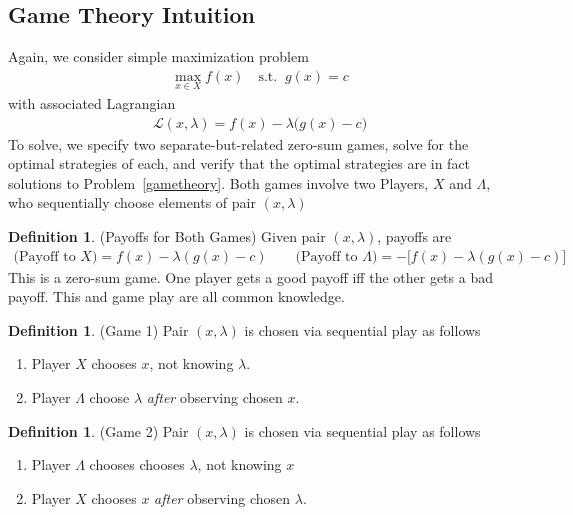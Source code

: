 \documentclass[12pt]{article}
\numberwithin{equation}{section} %
\theoremstyle{plain}
\theoremstyle{definition}
\newtheorem{defn}[thm]{Definition}
\theoremstyle{remark}
\newcommand{\sL}{\mathscr{L}}
\begin{document}
\subsection{Game Theory Intuition}

Again, we consider simple maximization problem
\begin{align}
  \max_{x\in X} f(x)
  \quad \text{s.t.}\;\; g(x) = c
  \label{gametheory}
\end{align}
with associated Lagrangian
\begin{align}
  \sL(x,\lambda)
  = f(x) - \lambda \big(g(x)-c\big)
  \label{gametheorylagrange}
\end{align}
To solve, we specify two separate-but-related zero-sum games, solve for
the optimal strategies of each, and verify that the optimal strategies
are in fact solutions to Problem~\ref{gametheory}.  Both games involve
two Players, $X$ and $\Lambda$, who sequentially choose elements of pair
$(x,\lambda)$

\begin{defn}(Payoffs for Both Games)
Given pair $(x,\lambda)$, payoffs are
\begin{align*}
  \text{(Payoff to $X$)}
  = f(x) - \lambda(g(x)-c)
  \qquad
  \text{(Payoff to $\Lambda$)}
  = -\big[f(x) - \lambda(g(x)-c)\big]
\end{align*}
This is a zero-sum game. One player gets a good payoff iff the other
gets a bad payoff. This and game play are all common knowledge.
\end{defn}

\begin{defn}(Game 1)
Pair $(x,\lambda)$ is chosen via sequential play as follows
\begin{enumerate}
  \item Player $X$ chooses $x$, not knowing $\lambda$.
  \item Player $\Lambda$ choose $\lambda$ \emph{after} observing chosen
    $x$.
\end{enumerate}
\end{defn}

\begin{defn}(Game 2)
Pair $(x,\lambda)$ is chosen via sequential play as follows
\begin{enumerate}
  \item Player $\Lambda$ chooses chooses $\lambda$, not knowing $x$
  \item Player $X$ chooses $x$ \emph{after} observing chosen $\lambda$.
\end{enumerate}
\end{defn}
\end{document}
